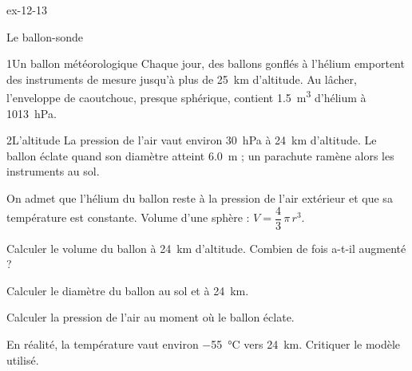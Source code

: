 \begin{blocLivre}{ex-12-13}
\begin{exercice}[3]{Le ballon-sonde}
\begin{docu}{1}{Un ballon météorologique}
Chaque jour, des ballons gonflés à l'hélium emportent des instruments de mesure jusqu'à plus de \qty{25}{km} d'altitude. Au
lâcher, l'enveloppe de caoutchouc, presque sphérique, contient \qty{1,5}{m^3} d'hélium à \qty{1013}{hPa}.
\end{docu}
\begin{docu}{2}{L'altitude}
La pression de l'air vaut environ \qty{30}{hPa} à \qty{24}{km} d'altitude. Le ballon éclate quand son diamètre atteint \qty{6,0}{m} ; un parachute
ramène alors les instruments au sol.
\end{docu}
\begin{donnees}
On admet que l'hélium du ballon reste à la pression de l'air extérieur et que sa température est constante. Volume d'une
sphère : $V=\dfrac{4}{3}\,\pi\,r^3$.
\end{donnees}
\begin{questions}
\item Calculer le volume du ballon à \qty{24}{km} d'altitude. Combien de fois a-t-il augmenté ?
\item Calculer le diamètre du ballon au sol et à \qty{24}{km}.
\item \initiative Calculer la pression de l'air au moment où le ballon éclate.
\item En réalité, la température vaut environ \qty{-55}{\degreeCelsius} vers \qty{24}{km}. Critiquer le modèle utilisé.
\end{questions}
\end{exercice}
\end{blocLivre}
